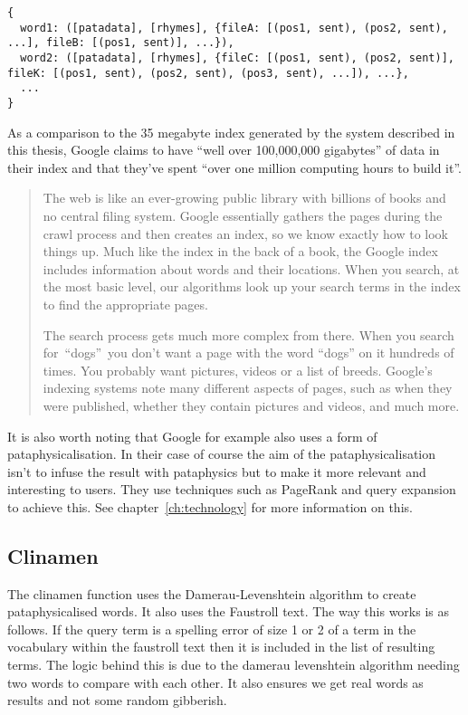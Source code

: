 \begin{verbatim}
{
  word1: ([patadata], [rhymes], {fileA: [(pos1, sent), (pos2, sent), ...], fileB: [(pos1, sent)], ...}),
  word2: ([patadata], [rhymes], {fileC: [(pos1, sent), (pos2, sent)], fileK: [(pos1, sent), (pos2, sent), (pos3, sent), ...]), ...},
  ...
}
\end{verbatim}

\spirals

As a comparison to the 35 megabyte index generated by the system described in this thesis, Google claims to have ``well over 100,000,000 gigabytes'' of data in their index and that they've spent ``over one million computing hours to build it''.

\begin{quotation}
  The web is like an ever-growing public library with billions of books and no central filing system. Google essentially gathers the pages during the crawl process and then creates an index, so we know exactly how to look things up. Much like the index in the back of a book, the Google index includes information about words and their locations. When you search, at the most basic level, our algorithms look up your search terms in the index to find the appropriate pages.

  The search process gets much more complex from there. When you search for ``dogs'' you don't want a page with the word ``dogs'' on it hundreds of times. You probably want pictures, videos or a list of breeds. Google's indexing systems note many different aspects of pages, such as when they were published, whether they contain pictures and videos, and much more.
\end{quotation}

It is also worth noting that Google for example also uses a form of pataphysicalisation. In their case of course the aim of the pataphysicalisation isn't to infuse the result with pataphysics but to make it more relevant and interesting to users. They use techniques such as PageRank and query expansion to achieve this. See chapter~\ref{ch:technology} for more information on this.


\subsection{Clinamen}

The clinamen function uses the Damerau-Levenshtein algorithm to create pataphysicalised words. It also uses the Faustroll text. The way this works is as follows. If the query term is a spelling error of size 1 or 2 of a term in the vocabulary within the faustroll text then it is included in the list of resulting terms. The logic behind this is due to the damerau levenshtein algorithm needing two words to compare with each other. It also ensures we get real words as results and not some random gibberish.

